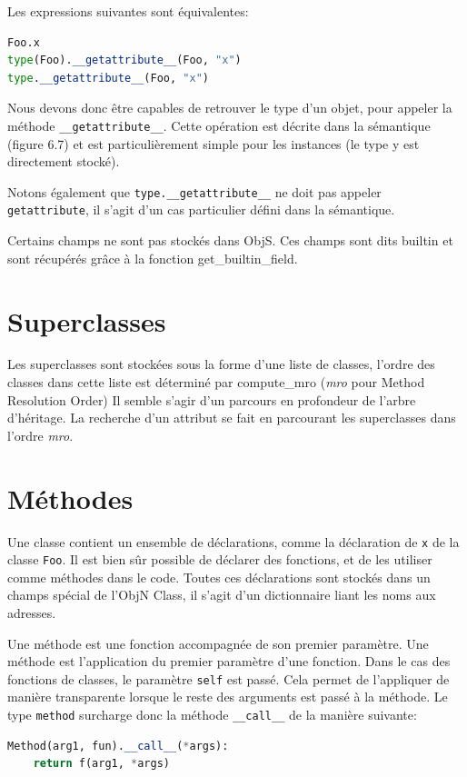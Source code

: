 \documentclass[a4paper, french, 11pt]{article}
\theoremstyle{break}
\begin{document}
Les expressions suivantes sont équivalentes:
\begin{lstlisting}[style=myStyle, language=python]
Foo.x
type(Foo).__getattribute__(Foo, "x")
type.__getattribute__(Foo, "x")
\end{lstlisting}

Nous devons donc être capables de retrouver le type d'un objet, pour appeler la méthode \texttt{\_\_getattribute\_\_}.
Cette opération est décrite dans la sémantique (figure 6.7) et est particulièrement simple pour les instances (le type y est directement stocké).

Notons également que \texttt{type.\_\_getattribute\_\_} ne doit pas appeler \texttt{getattribute}, il s'agit d'un cas particulier défini dans la sémantique.

Certains champs ne sont pas stockés dans \textsf{ObjS}.
Ces champs sont dits \og builtin\fg{} et sont récupérés grâce à la fonction \textsf{get\_builtin\_field}.

\section{Superclasses}
Les superclasses sont stockées sous la forme d'une liste de classes, l'ordre des classes dans cette liste est déterminé par \textsf{compute\_mro} (\emph{mro} pour \og Method Resolution Order\fg{})
Il semble s'agir d'un parcours en profondeur de l'arbre d'héritage.
La recherche d'un attribut se fait en parcourant les superclasses dans l'ordre \emph{mro}.

\section{Méthodes}
Une classe contient un ensemble de déclarations, comme la déclaration de \texttt{x} de la classe \texttt{Foo}.
Il est bien sûr possible de déclarer des fonctions, et de les utiliser comme méthodes dans le code.
Toutes ces déclarations sont stockés dans un champs spécial de l'\textsf{ObjN} \textsf{Class}, il s'agit d'un dictionnaire liant les noms aux adresses.


Une méthode est une fonction accompagnée de son premier paramètre.
Une méthode est l'application du premier paramètre d'une fonction.
Dans le cas des fonctions de classes, le paramètre \texttt{self} est passé.
Cela permet de l'appliquer de manière transparente lorsque le reste des arguments est passé à la méthode.
Le type \texttt{method} surcharge donc la méthode \texttt{\_\_call\_\_} de la manière suivante:
\begin{lstlisting}[style=myStyle, language=python]
Method(arg1, fun).__call__(*args):
    return f(arg1, *args)
\end{lstlisting}
\end{document}
